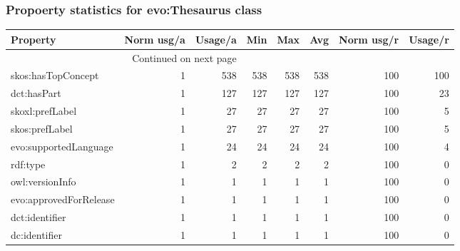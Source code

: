 \documentclass[10pt,a4paper,titlepage,final]{article}
\begin{document}
\subsubsection{Propoerty statistics for evo:Thesaurus class}
\begin{longtable}{lrrrrrrr}
\toprule
               Property &  Norm usg/a &  Usage/a &  Min &  Max &  Avg &  Norm usg/r &  Usage/r \\
\midrule
\endhead
\midrule
\multicolumn{3}{r}{{Continued on next page}} \\
\midrule
\endfoot

\bottomrule
\endlastfoot
     skos:hasTopConcept &           1 &      538 &  538 &  538 &  538 &         100 &      100 \\
            dct:hasPart &           1 &      127 &  127 &  127 &  127 &         100 &       23 \\
        skoxl:prefLabel &           1 &       27 &   27 &   27 &   27 &         100 &        5 \\
         skos:prefLabel &           1 &       27 &   27 &   27 &   27 &         100 &        5 \\
  evo:supportedLanguage &           1 &       24 &   24 &   24 &   24 &         100 &        4 \\
               rdf:type &           1 &        2 &    2 &    2 &    2 &         100 &        0 \\
        owl:versionInfo &           1 &        1 &    1 &    1 &    1 &         100 &        0 \\
 evo:approvedForRelease &           1 &        1 &    1 &    1 &    1 &         100 &        0 \\
         dct:identifier &           1 &        1 &    1 &    1 &    1 &         100 &        0 \\
          dc:identifier &           1 &        1 &    1 &    1 &    1 &         100 &        0 \\
\end{longtable}
\end{document}
